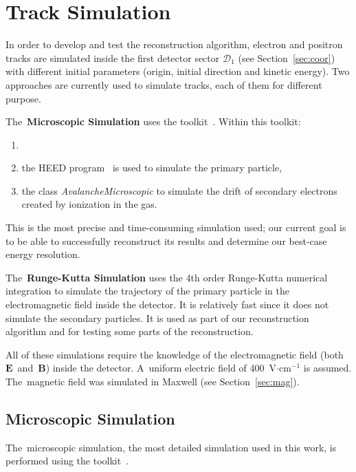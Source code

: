 \chapter{Track Simulation}
	In order to develop and test the reconstruction algorithm, electron and positron tracks are simulated inside the first detector sector $\mathcal{D}_1$ (see Section~\ref{sec:coor}) with different initial parameters (origin, initial direction and kinetic energy). Two approaches are currently used to simulate tracks, each of them for different purpose.
	
	The~\textbf{Microscopic Simulation} uses the \garfieldpp toolkit~\cite{Garfield++}. Within this toolkit:
		\begin{enumerate}[nosep,label=\alph*)]
			\item {}
			\item the \ac{HEED} program~\cite{HEED} is used to simulate the primary particle,
			\item the class \textit{AvalancheMicroscopic} to simulate the drift of secondary electrons created by ionization in the gas.
		\end{enumerate}
	This is the most precise and time-consuming simulation used; our current goal is to be able to successfully reconstruct its results and determine our best-case energy resolution.
	
	The~\textbf{Runge-Kutta Simulation} uses the 4th order Runge-Kutta numerical integration to simulate the trajectory of the primary particle in the electromagnetic field inside the detector. It is relatively fast since it does not simulate the secondary particles. It is used as part of our reconstruction algorithm and for testing some parts of the reconstruction.
	
	All of these simulations require the knowledge of the electromagnetic field (both $\mathbf{E}$~and~$\mathbf{B}$) inside the detector. A~uniform electric field of 400~V$\cdot$cm$^{-1}$ is assumed. The~magnetic field was simulated in Maxwell (see Section~\ref{sec:mag}).
	
	
	\section{Microscopic Simulation}
	\label{sec:microsim}
		The~microscopic simulation, the most detailed simulation used in this work, is performed using the \garfieldpp toolkit~\cite{Garfield++}.
		
